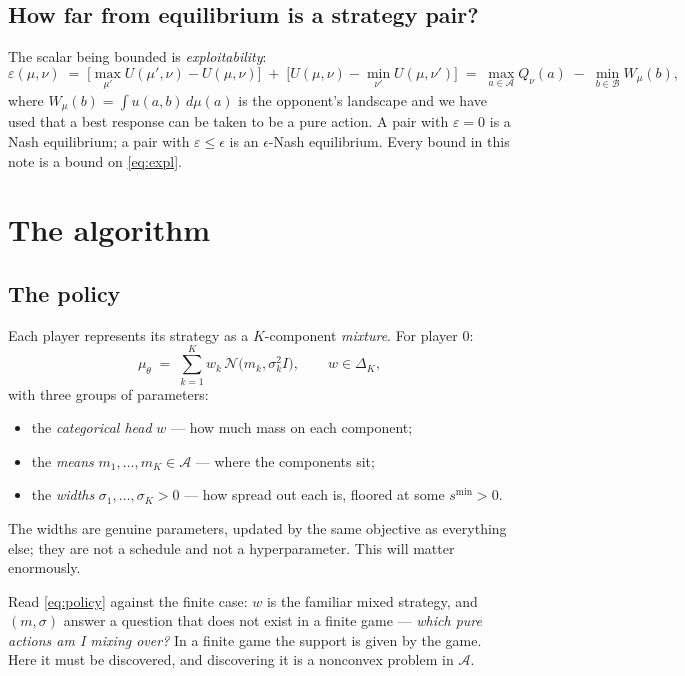 \documentclass[11pt]{article}
\theoremstyle{definition}
\newcommand{\cA}{\mathcal{A}}
\newcommand{\cB}{\mathcal{B}}
\newcommand{\cN}{\mathcal{N}}
\begin{document}
\subsection*{How far from equilibrium is a strategy pair?}

The scalar being bounded is \emph{exploitability}:
\begin{equation}\label{eq:expl}
  \varepsilon(\mu,\nu)
  \;=\;
  \Big[\max_{\mu'} U(\mu',\nu) - U(\mu,\nu)\Big]
  \;+\;
  \Big[U(\mu,\nu) - \min_{\nu'} U(\mu,\nu')\Big]
  \;=\;
  \max_{a\in\cA} Q_\nu(a) \;-\; \min_{b\in\cB} W_\mu(b),
\end{equation}
where $W_\mu(b) = \int u(a,b)\,d\mu(a)$ is the opponent's landscape and we have
used that a best response can be taken to be a pure action. A pair with
$\varepsilon = 0$ is a Nash equilibrium; a pair with $\varepsilon \le \epsilon$
is an $\epsilon$-Nash equilibrium. Every bound in this note is a bound on
\eqref{eq:expl}.

\section{The algorithm}

\subsection*{The policy}

Each player represents its strategy as a $K$-component \emph{mixture}. For player
$0$:
\begin{equation}\label{eq:policy}
  \mu_\theta \;=\; \sum_{k=1}^{K} w_k \, \cN\!\big(m_k, \sigma_k^2 I\big),
  \qquad w \in \Delta_K ,
\end{equation}
with three groups of parameters:
\begin{itemize}[leftmargin=1.4em, itemsep=2pt]
\item the \emph{categorical head} $w$ --- how much mass on each component;
\item the \emph{means} $m_1,\dots,m_K \in \cA$ --- where the components sit;
\item the \emph{widths} $\sigma_1,\dots,\sigma_K > 0$ --- how spread out each is,
  floored at some $s^{\min} > 0$.
\end{itemize}
The widths are genuine parameters, updated by the same objective as everything
else; they are not a schedule and not a hyperparameter. This will matter enormously.

Read \eqref{eq:policy} against the finite case: $w$ is the familiar mixed
strategy, and $(m,\sigma)$ answer a question that does not exist in a finite game
--- \emph{which pure actions am I mixing over?} In a finite game the support is
given by the game. Here it must be discovered, and discovering it is a nonconvex
problem in $\cA$.
\end{document}
